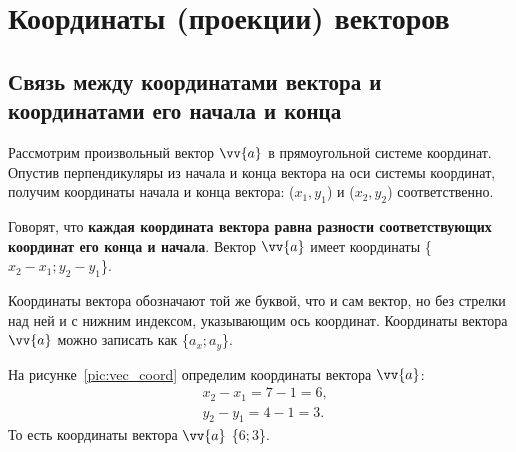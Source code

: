 \section{Координаты (проекции) векторов}

\subsection{Связь между координатами вектора и координатами
его начала и конца}
Рассмотрим произвольный вектор $\vv{a}$ в прямоугольной системе координат.
Опустив перпендикуляры из начала и конца вектора на оси системы координат,
получим координаты начала и конца вектора: ($x_1, y_1$) и ($x_2, y_2$)
соответственно.

Говорят, что \textbf{каждая координата вектора равна разности соответствующих
координат его конца и начала}.
Вектор $\vv{a}$ имеет координаты {\large\{$x_2-x_1; y_2-y_1$\}}.

Координаты вектора обозначают той же буквой, что и сам вектор, но без стрелки над ней
и с нижним индексом, указывающим ось координат. Координаты вектора $\vv{a}$ можно записать
как {\large\{$a_x; a_y$\}}.

На рисунке~\ref{pic:vec_coord} определим координаты вектора $\vv{a}$:
\begin{align*}
  &x_2-x_1 = 7 -1 = 6,\\
  &y_2-y_1 = 4-1=3.
\end{align*}
То есть координаты вектора $\vv{a}$ \{$6; 3$\}.

